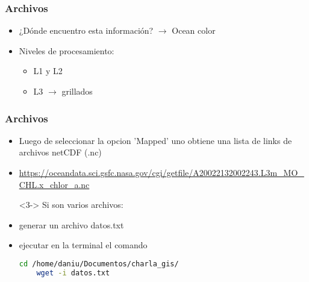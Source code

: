 \documentclass{beamer}
\begin{document}
\begin{frame}[t]
\frametitle{Archivos}

\begin{itemize}
	\item<1-> ¿Dónde encuentro esta información? $\rightarrow$ Ocean color \href{https://oceancolor.gsfc.nasa.gov/}{}

	\item<2-> Niveles de procesamiento:
\begin{itemize}
	\item L1 y L2
	\item L3 $\rightarrow$ grillados 
\end{itemize}

   \begin{figure}
	
	
   \end{figure}

\end{itemize}
\end{frame}


\begin{frame}[fragile]
\frametitle{Archivos}

\begin{itemize}
	\item<1-> Luego de seleccionar la opcion 'Mapped' uno obtiene una lista de links de archivos netCDF (.nc)
	\item<2-> \url{https://oceandata.sci.gsfc.nasa.gov/cgi/getfile/A20022132002243.L3m_MO_CHL.x_chlor_a.nc} \href{https://oceandata.sci.gsfc.nasa.gov/cgi/getfile/A20022132002243.L3m_MO_CHL.x_chlor_a.nc}{}
\end{itemize}

\begin{itemize}
	\item[]<3-> Si son varios archivos:
	\item<4-> generar un archivo datos.txt 
	\item<4-> ejecutar en la terminal el comando 
	
	\begin{lstlisting}[language=bash, basicstyle=\scriptsize]
	cd /home/daniu/Documentos/charla_gis/
	wget -i datos.txt  
	\end{lstlisting}
\end{itemize}

\end{frame}
\end{document}
